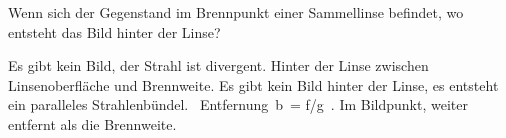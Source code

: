 \documentclass[11pt]{exam}
\begin{document}
\begin{questions}
\vspace{3mm}\question Wenn sich der Gegenstand im Brennpunkt einer Sammellinse befindet, wo entsteht das Bild hinter der Linse?

\begin{choices}
	\choice Es gibt kein Bild, der Strahl ist divergent.
	\choice Hinter der Linse zwischen Linsenoberfläche und Brennweite.
	\choice Es gibt kein Bild hinter der Linse, es entsteht ein paralleles Strahlenbündel.
	\choice  Entfernung b = f/g .
	\choice Im Bildpunkt, weiter entfernt als die Brennweite.
\end{choices}

\vspace{3mm}\end{questions}
\end{document}
